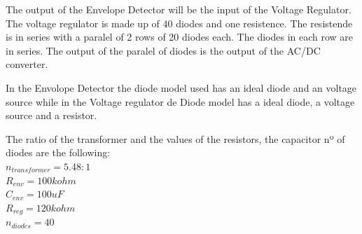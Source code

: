 The output of the Envelope Detector will be the input of the Voltage Regulator. The voltage regulator is made up of 40 diodes and one resistence. The resistende is in series with a paralel of 2 rows of 20 diodes each. The diodes in each row are in series. The output of the paralel of diodes is the output of the AC/DC converter.

In the Envolope Detector the diode model used has an ideal diode and an voltage source while in the Voltage regulator de Diode model has a ideal diode, a voltage source and a resistor. 

The ratio of the transformer and the values of the resistors, the capacitor nº of diodes are the following:\\
$ n_{transformer} = 5.48:1 $  \\
$ R_{env} = 100 kohm$  \\
$ C_{env} = 100 uF$  \\
$ R_{reg} = 120 kohm$  \\
$ n_{diodes} = 40 $   \\














\pagebreak



